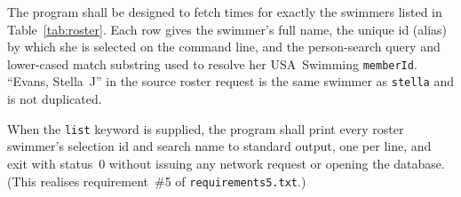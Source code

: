 \documentclass[12pt]{article}
\newcommand{\code}[1]{\texttt{#1}}
\newcommand{\req}[1]{\textbf{[#1]}}
\begin{document}
\begin{description}[style=nextline]
  \item[\req{REQ-F-17}] The program shall be designed to fetch times
        for exactly the swimmers listed in Table~\ref{tab:roster}.
        Each row gives the swimmer's full name, the unique id (alias)
        by which she is selected on the command line, and the
        person-search query and lower-cased match substring used to
        resolve her USA~Swimming \code{memberId}.  ``Evans, Stella~J''
        in the source roster request is the same swimmer as
        \code{stella} and is not duplicated.
  \item[\req{REQ-F-18}] When the \code{list} keyword is supplied, the
        program shall print every roster swimmer's selection id and
        search name to standard output, one per line, and exit with
        status~0 without issuing any network request or opening the
        database.  (This realises requirement~\#5 of
        \texttt{requirements5.txt}.)
\end{description}
\end{document}

